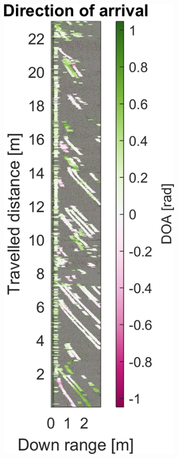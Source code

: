 \begin{figure}[htbp]
\begin{subfigure}[t]{0.475\linewidth}
    \end{subfigure}\bigskip\\
    \begin{subfigure}[t]{0.475\linewidth}  
        \centering 
        \includegraphics[width=\linewidth,max height=.475\textheight]{gfx/results/sauna_doa.png}

\end{subfigure}
\end{figure}

